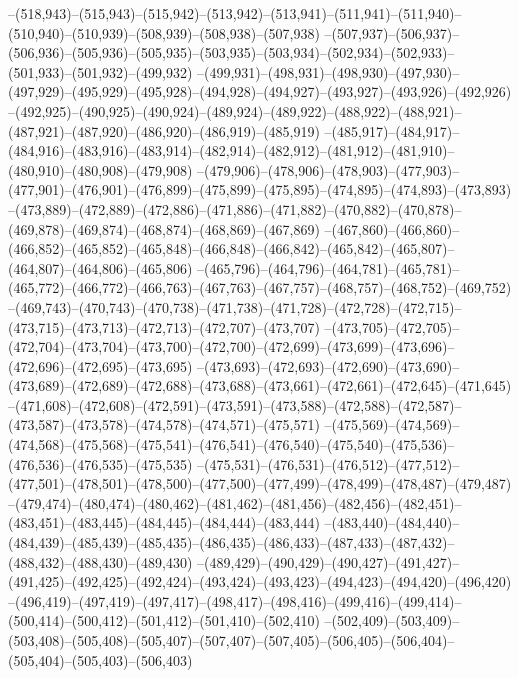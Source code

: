--(518,943)--(515,943)--(515,942)--(513,942)--(513,941)--(511,941)--(511,940)--(510,940)--(510,939)--(508,939)--(508,938)--(507,938)
--(507,937)--(506,937)--(506,936)--(505,936)--(505,935)--(503,935)--(503,934)--(502,934)--(502,933)--(501,933)--(501,932)--(499,932)
--(499,931)--(498,931)--(498,930)--(497,930)--(497,929)--(495,929)--(495,928)--(494,928)--(494,927)--(493,927)--(493,926)--(492,926)
--(492,925)--(490,925)--(490,924)--(489,924)--(489,922)--(488,922)--(488,921)--(487,921)--(487,920)--(486,920)--(486,919)--(485,919)
--(485,917)--(484,917)--(484,916)--(483,916)--(483,914)--(482,914)--(482,912)--(481,912)--(481,910)--(480,910)--(480,908)--(479,908)
--(479,906)--(478,906)--(478,903)--(477,903)--(477,901)--(476,901)--(476,899)--(475,899)--(475,895)--(474,895)--(474,893)--(473,893)
--(473,889)--(472,889)--(472,886)--(471,886)--(471,882)--(470,882)--(470,878)--(469,878)--(469,874)--(468,874)--(468,869)--(467,869)
--(467,860)--(466,860)--(466,852)--(465,852)--(465,848)--(466,848)--(466,842)--(465,842)--(465,807)--(464,807)--(464,806)--(465,806)
--(465,796)--(464,796)--(464,781)--(465,781)--(465,772)--(466,772)--(466,763)--(467,763)--(467,757)--(468,757)--(468,752)--(469,752)
--(469,743)--(470,743)--(470,738)--(471,738)--(471,728)--(472,728)--(472,715)--(473,715)--(473,713)--(472,713)--(472,707)--(473,707)
--(473,705)--(472,705)--(472,704)--(473,704)--(473,700)--(472,700)--(472,699)--(473,699)--(473,696)--(472,696)--(472,695)--(473,695)
--(473,693)--(472,693)--(472,690)--(473,690)--(473,689)--(472,689)--(472,688)--(473,688)--(473,661)--(472,661)--(472,645)--(471,645)
--(471,608)--(472,608)--(472,591)--(473,591)--(473,588)--(472,588)--(472,587)--(473,587)--(473,578)--(474,578)--(474,571)--(475,571)
--(475,569)--(474,569)--(474,568)--(475,568)--(475,541)--(476,541)--(476,540)--(475,540)--(475,536)--(476,536)--(476,535)--(475,535)
--(475,531)--(476,531)--(476,512)--(477,512)--(477,501)--(478,501)--(478,500)--(477,500)--(477,499)--(478,499)--(478,487)--(479,487)
--(479,474)--(480,474)--(480,462)--(481,462)--(481,456)--(482,456)--(482,451)--(483,451)--(483,445)--(484,445)--(484,444)--(483,444)
--(483,440)--(484,440)--(484,439)--(485,439)--(485,435)--(486,435)--(486,433)--(487,433)--(487,432)--(488,432)--(488,430)--(489,430)
--(489,429)--(490,429)--(490,427)--(491,427)--(491,425)--(492,425)--(492,424)--(493,424)--(493,423)--(494,423)--(494,420)--(496,420)
--(496,419)--(497,419)--(497,417)--(498,417)--(498,416)--(499,416)--(499,414)--(500,414)--(500,412)--(501,412)--(501,410)--(502,410)
--(502,409)--(503,409)--(503,408)--(505,408)--(505,407)--(507,407)--(507,405)--(506,405)--(506,404)--(505,404)--(505,403)--(506,403)
